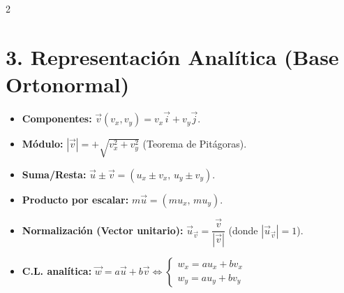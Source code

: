\documentclass[9pt,a4paper]{article}
\begin{document}
\begin{multicols}{2}
\section{3. Representación Analítica (Base Ortonormal)}
\begin{itemize}
    \item \textbf{Componentes:} $\vec{v}(v_x, v_y) = v_x \vec{i} + v_y \vec{j}$.
    \item \textbf{Módulo:} $|\vec{v}| = +\sqrt{v_x^2 + v_y^2}$ (Teorema de Pitágoras).
    \item \textbf{Suma/Resta:} $\vec{u} \pm \vec{v} = (u_x \pm v_x, \, u_y \pm v_y)$.
    \item \textbf{Producto por escalar:} $m\vec{u} = (m u_x, \, m u_y)$.
    \item \textbf{Normalización (Vector unitario):} $\vec{u}_{\vec{v}} = \dfrac{\vec{v}}{|\vec{v}|}$ (donde $|\vec{u}_{\vec{v}}| = 1$).
    \item \textbf{C.L. analítica:} $\vec{w} = a\vec{u} + b\vec{v} \iff \begin{cases} w_x = a u_x + b v_x \\ w_y = a u_y + b v_y \end{cases}$
\end{itemize}


\end{multicols}
\end{document}
